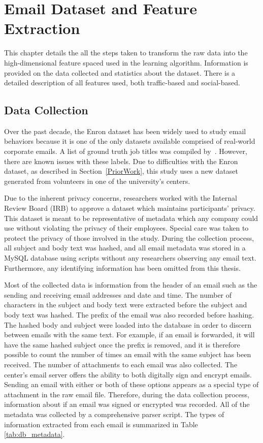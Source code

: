 \documentclass[12pt]{report}
\begin{document}
\chapter{Email Dataset and Feature Extraction} \label{Data}

This chapter details the all the steps taken to transform the raw data into the high-dimensional feature spaced used in the learning algorithm.
Information is provided on the data collected and statistics about the dataset.
There is a detailed description of all features used, both traffic-based and social-based.

\section{Data Collection}
Over the past decade, the Enron dataset has been widely used to study email behaviors because it is one of the only datasets available comprised of real-world corporate emails.
A list of ground truth job titles was compiled by~\cite{shetty_status_2004}.  However, there are known issues with these labels.
Due to difficulties with the Enron dataset, as described in Section~\ref{PriorWork}, this study uses a new dataset generated from volunteers in one of the university's centers.

Due to the inherent privacy concerns, researchers worked with the Internal Review Board (IRB) to approve a dataset which maintains participants' privacy.
This dataset is meant to be representative of metadata which any company could use without violating the privacy of their employees.
Special care was taken to protect the privacy of those involved in the study.
During the collection process, all subject and body text was hashed, and all email metadata was stored in a MySQL database using scripts without any researchers observing any email text.
Furthermore, any identifying information has been omitted from this thesis.

Most of the collected data is information from the header of an email such as the sending and receiving email addresses and date and time.
The number of characters in the subject and body text were extracted before the subject and body text was hashed.
The prefix of the email was also recorded before hashing.
The hashed body and subject were loaded into the database in order to discern between emails with the same text.
For example, if an email is forwarded, it will have the same hashed subject once the prefix is removed, and it is therefore possible to count the number of times an email with the same subject has been received.
The number of attachments to each email was also collected.
The center's email server offers the ability to both digitally sign and encrypt emails.
Sending an email with either or both of these options appears as a special type of attachment in the raw email file.
Therefore, during the data collection process, information about if an email was signed or encrypted was recorded.  All of the metadata was collected by a comprehensive parser script.  The types of information extracted from each email is summarized in Table \ref{tab:db_metadata}.
\end{document}
